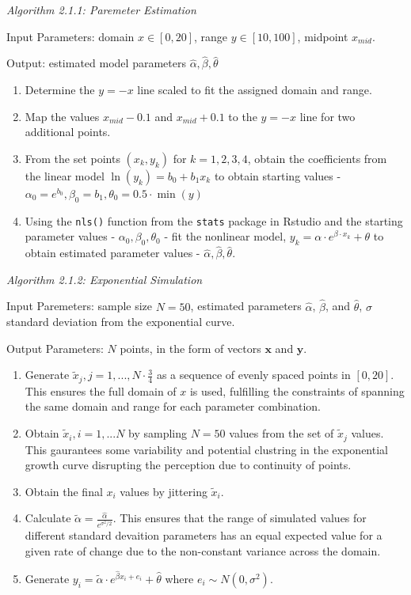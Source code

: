 \documentclass[print]{nuthesis}
\begin{document}
\textit{Algorithm 2.1.1: Paremeter Estimation}

Input Parameters: domain \(x\in[0,20]\), range \(y\in[10,100]\), midpoint \(x_{mid}\).

Output: estimated model parameters \(\hat\alpha, \hat\beta, \hat\theta\)

\begin{enumerate}
\def\labelenumi{\arabic{enumi}.}
\item
  Determine the \(y=-x\) line scaled to fit the assigned domain and range.
\item
  Map the values \(x_{mid} - 0.1\) and \(x_{mid} + 0.1\) to the \(y=-x\) line for two additional points.
\item
  From the set points \((x_k, y_k)\) for \(k = 1,2,3,4\), obtain the coefficients from the linear model \(\ln(y_k) = b_0 +b_1x_k\) to obtain starting values - \(\alpha_0 = e^{b_0}, \beta_0 = b_1, \theta_0 = 0.5\cdot \min(y)\)
\item
  Using the \texttt{nls()} function from the \texttt{stats} package in Rstudio and the starting parameter values - \(\alpha_0, \beta_0, \theta_0\) - fit the nonlinear model, \(y_k = \alpha\cdot e^{\beta\cdot x_k}+\theta\) to obtain estimated parameter values - \(\hat\alpha, \hat\beta, \hat\theta.\)
\end{enumerate}

\noindent\textit{Algorithm 2.1.2: Exponential Simulation}

Input Paremeters: sample size \(N = 50\), estimated parameters \(\hat\alpha\), \(\hat\beta\), and \(\hat\theta\), \(\sigma\) standard deviation from the exponential curve.

Output Parameters: \(N\) points, in the form of vectors \(\mathbf{x}\) and \(\mathbf{y}\).

\begin{enumerate}
\def\labelenumi{\arabic{enumi}.}
\item
  Generate \(\tilde x_j, j = 1,..., N\cdot \frac{3}{4}\) as a sequence of evenly spaced points in \([0,20]\). This ensures the full domain of \(x\) is used, fulfilling the constraints of spanning the same domain and range for each parameter combination.
\item
  Obtain \(\tilde x_i, i = 1,...N\) by sampling \(N = 50\) values from the set of \(\tilde x_j\) values. This gaurantees some variability and potential clustring in the exponential growth curve disrupting the perception due to continuity of points.
\item
  Obtain the final \(x_i\) values by jittering \(\tilde x_i\).
\item
  Calculate \(\tilde\alpha = \frac{\hat\alpha}{e^{\sigma^2/2}}.\) This ensures that the range of simulated values for different standard devaition parameters has an equal expected value for a given rate of change due to the non-constant variance across the domain.
\item
  Generate \(y_i = \tilde\alpha\cdot e^{\hat\beta x_i + e_i}+\hat\theta\) where \(e_i\sim N(0,\sigma^2).\)
\end{enumerate}
\end{document}
